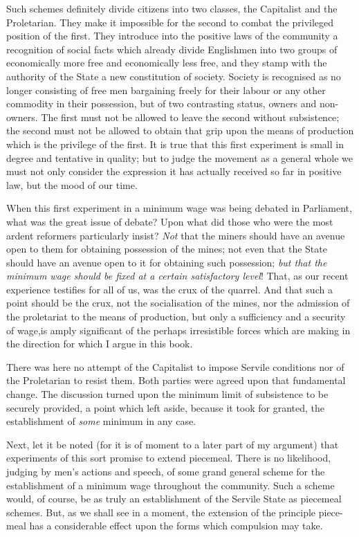 \documentclass{book}
\begin{document}
Such schemes definitely divide citizens into two classes, the Capitalist and the Proletarian. They make it impossible for the second to combat the privileged position of the first. They introduce into the positive laws of the community a recognition of social facts which already divide Englishmen into two groups of economically more free and economically less free, and they stamp with the authority of the State a new constitution of society. Society is recognised as no longer consisting of free men bargaining freely for their labour or any other commodity in their possession, but of two contrasting status, owners and non-owners. The first must not be allowed to leave the second without subsistence; the second must not be allowed to obtain that grip upon the means of production which is the privilege of the first. It is true that this first experiment is small in degree and tentative in quality; but to judge the movement as a general whole we must not only consider the expression it has actually received so far in positive law, but the mood of our time.

When this first experiment in a minimum wage was being debated in Parliament, what was the great issue of debate? Upon what did those who were the most ardent reformers particularly insist? \emph{Not} that the miners should have an avenue open to them for obtaining possession of the mines; not even that the State should have an avenue open to it for obtaining such possession; \emph{but that the minimum wage should be fixed at a certain satisfactory level}! That, as our recent experience testifies for all of us, was the crux of the quarrel. And that such a point should be the crux, not the socialisation of the mines, nor the admission of the proletariat to the means of production, but only a sufficiency and a security of wage,is amply significant of the perhaps irresistible forces which are making in the direction for which I argue in this book.

There was here no attempt of the Capitalist to impose Servile conditions nor of the Proletarian to resist them. Both parties were agreed upon that fundamental change. The discussion turned upon the minimum limit of subsistence to be securely provided, a point which left aside, because it took for granted, the establishment of \emph{some} minimum in any case.

Next, let it be noted (for it is of moment to a later part of my argument) that experiments of this sort promise to extend piecemeal. There is no likelihood, judging by men’s actions and speech, of some grand general scheme for the establishment of a minimum wage throughout the community. Such a scheme would, of course, be as truly an establishment of the Servile State as piecemeal schemes. But, as we shall see in a moment, the extension of the principle piece-meal has a considerable effect upon the forms which compulsion may take.
\end{document}
